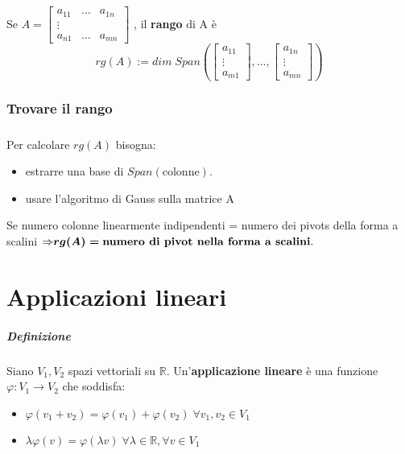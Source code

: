 \documentclass[a4paper, 12pt]{report}
\begin{document}
            \paragraph{}Se 
            $
            A=
            \begin{bmatrix}
                a_{11} & \dots & a_{1n}\\
                \vdots\\
                a_{n1} & \dots & a_{mn}                
            \end{bmatrix}
            $
            , il \textbf{rango} di A è
            $$
            rg(A):=dim \; Span \left (
                \begin{bmatrix}
                    a_{11}\\
                    \vdots\\
                    a_{m1}
                \end{bmatrix}
            , ... ,
                \begin{bmatrix}
                    a_{1n}\\
                    \vdots\\
                    a_{mn}
                \end{bmatrix}
            \right )
            $$
            \subsection{Trovare il rango}
            \paragraph{}Per calcolare $rg(A)$ bisogna: 
            \begin{itemize}
                \item estrarre una base di $Span(\text{colonne})$.
                \item usare l'algoritmo di Gauss sulla matrice A
            \end{itemize}
            Se numero colonne linearmente indipendenti = numero dei pivots della forma a scalini $\Rightarrow \boldsymbol{rg(A)=} \text{\textbf{numero di pivot nella forma a scalini}.}$

    \chapter{Applicazioni lineari}
        \paragraph{Definizione}Siano $V_1,V_2$ spazi vettoriali su $\mathbb{R}$. Un'\textbf{applicazione lineare} è una funzione $\varphi: V_1 \rightarrow V_2$ che soddisfa:
            \begin{itemize}
                \item $\varphi (v_1+v_2)=\varphi(v_1)+\varphi(v_2) \; \forall v_1,v_2 \in V_1$
                \item $\lambda \varphi(v)=\varphi(\lambda v) \; \forall \lambda \in \mathbb{R}, \forall v \in V_1$
            \end{itemize}
        \clearpage
\end{document}
